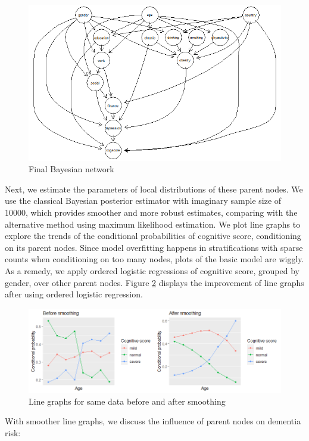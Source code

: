 \documentclass[11pt,twoside]{article}
\numberwithin{Theorem}{section}
\numberwithin{Definition}{section}
\numberwithin{Lemma}{section}
\numberwithin{Algorithm}{section}
\numberwithin{equation}{section}
\begin{document}
\begin{figure}[!h]
	\centering
	\includegraphics[width = 0.75 \textwidth]{Images/hc_mod.png}
	\caption{Final Bayesian network}
	\label{fig:hc_mod}
\end{figure}

Next, we estimate the parameters of local distributions of these parent nodes. We use the classical Bayesian posterior estimator with imaginary sample size of 10000, which provides smoother and more robust estimates, comparing with the alternative method using maximum likelihood estimation. We plot line graphs to explore the trends of the conditional probabilities of cognitive score, conditioning on its parent nodes. Since model overfitting happens in stratifications with sparse counts when conditioning on too many nodes, plots of the basic model are wiggly. As a remedy, we apply ordered logistic regressions of cognitive score, grouped by gender, over other parent nodes. Figure \ref{fig:smoothing} displays the improvement of line graphs after using ordered logistic regression.

\begin{figure}[!h]
	\centering
	\includegraphics[width = \textwidth]{Images/smoothing.png}
	\caption{Line graphs for same data before and after smoothing}
	\label{fig:smoothing}
\end{figure}

With smoother line graphs, we discuss the influence of parent nodes on dementia risk:
\end{document}

